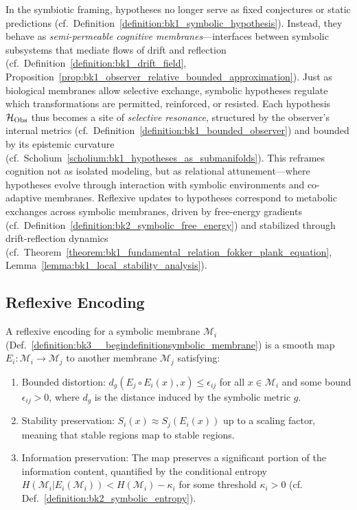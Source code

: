 \begin{scholium} \label{scholium:bk3__beginscholiumhypotheses_as_cognitive_me}
In the symbiotic framing, hypotheses no longer serve as fixed conjectures or static predictions (cf.~Definition~\ref{definition:bk1_symbolic_hypothesis}). Instead, they behave as \emph{semi-permeable cognitive membranes}—interfaces between symbolic subsystems that mediate flows of drift and reflection (cf.~Definition~\ref{definition:bk1_drift_field}, Proposition~\ref{prop:bk1_observer_relative_bounded_approximation}).
Just as biological membranes allow selective exchange, symbolic hypotheses regulate which transformations are permitted, reinforced, or resisted. Each hypothesis \(\mathcal{H}_{\mathrm{Obs}}\) thus becomes a site of \emph{selective resonance}, structured by the observer’s internal metrics (cf.~Definition~\ref{definition:bk1_bounded_observer}) and bounded by its epistemic curvature (cf.~Scholium~\ref{scholium:bk1_hypotheses_as_submanifolds}).
This reframes cognition not as isolated modeling, but as relational attunement—where hypotheses evolve through interaction with symbolic environments and co-adaptive membranes. Reflexive updates to hypotheses correspond to metabolic exchanges across symbolic membranes, driven by free-energy gradients (cf.~Definition~\ref{definition:bk2_symbolic_free_energy}) and stabilized through drift-reflection dynamics (cf.~Theorem~\ref{theorem:bk1_fundamental_relation_fokker_plank_equation}, Lemma~\ref{lemma:bk1_local_stability_analysis}).
\end{scholium}

\subsection{Reflexive Encoding}

\begin{definition} \label{definition:bk3__begindefinitionreflexive_encoding}
A reflexive encoding for a symbolic membrane $\mathcal{M}_i$ (Def.~\ref{definition:bk3__begindefinitionsymbolic_membrane}) is a smooth map $E_i: \mathcal{M}_i \rightarrow \mathcal{M}_j$ to another membrane $\mathcal{M}_j$ satisfying:
\begin{enumerate}
    \item Bounded distortion: $d_g(E_j \circ E_i(x), x) \leq \epsilon_{ij}$ for all $x \in \mathcal{M}_i$ and some bound $\epsilon_{ij} > 0$, where $d_g$ is the distance induced by the symbolic metric $g$.
    \item Stability preservation: $S_i(x) \approx S_j(E_i(x))$ up to a scaling factor, meaning that stable regions map to stable regions.
    \item Information preservation: The map preserves a significant portion of the information content, quantified by the conditional entropy $H(\mathcal{M}_i | E_i(\mathcal{M}_i)) < H(\mathcal{M}_i) - \kappa_i$ for some threshold $\kappa_i > 0$ (cf. Def.~\ref{definition:bk2_symbolic_entropy}).
\end{enumerate}
\end{definition}

